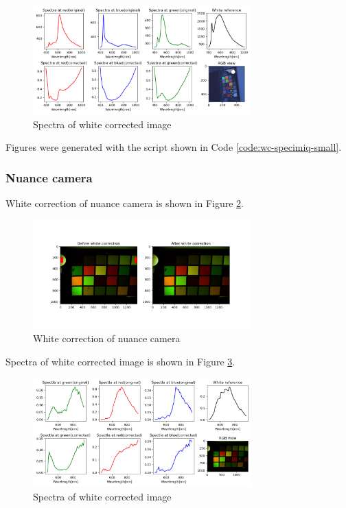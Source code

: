 \begin{figure}[H]
  \centering
  \caption{Spectra of white corrected image}
  \label{fig:wc-specimiq-small-spectra}
  \includegraphics[width=0.75\textwidth]{
    ./fig-task1/wc-specimiq-small-spectra.png
  }
\end{figure}

Figures were generated with the script shown in Code
\ref{code:wc-specimiq-small}.

\subsubsection{Nuance camera}

White correction of nuance camera is shown in Figure
\ref{fig:wc-nuance-camera-small}.

\begin{figure}[H]
  \centering
  \caption{White correction of nuance camera}
  \label{fig:wc-nuance-camera-small}
  \includegraphics[width=0.75\textwidth]{
    ./fig-task1/wc-nuance-small.png
  }
\end{figure}

Spectra of white corrected image is shown in Figure
\ref{fig:wc-nuance-camera-small-spectra}.

\begin{figure}[H]
  \centering
  \caption{Spectra of white corrected image}
  \label{fig:wc-nuance-camera-small-spectra}
  \includegraphics[width=0.75\textwidth]{
    ./fig-task1/wc-nuance-spectra-small.png
  }
\end{figure}

